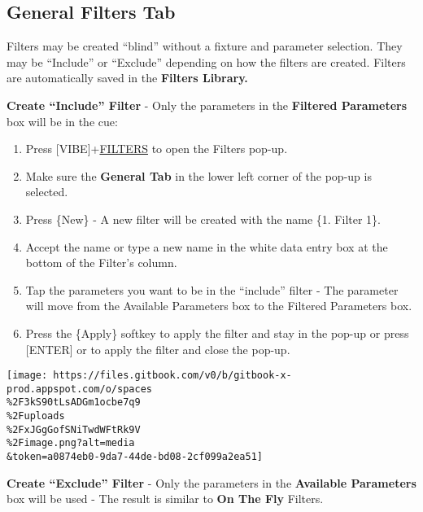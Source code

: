 \documentclass[
]{article}
\begin{document}
\hypertarget{general-filters-tab}{%
\subsection{General Filters Tab}\label{general-filters-tab}}

Filters may be created ``blind'' without a fixture and parameter selection. They may be ``Include'' or ``Exclude'' depending on how the filters are created. Filters are automatically saved in the \textbf{Filters Library.}

\textbf{Create ``Include'' Filter} - Only the parameters in the \textbf{Filtered Parameters} box will be in the cue:

\begin{enumerate}
\def\labelenumi{\arabic{enumi}.}
\item
  Press {[}VIBE{]}+\protect\hyperlink{filters}{FILTERS} to open the Filters pop-up.
\item
  Make sure the \textbf{General Tab} in the lower left corner of the pop-up is selected.
\item
  Press \{New\} - A new filter will be created with the name \{1. Filter 1\}.
\item
  Accept the name or type a new name in the white data entry box at the bottom of the Filter's column.
\item
  Tap the parameters you want to be in the ``include'' filter - The parameter will move from the Available Parameters box to the Filtered Parameters box.
\item
  Press the \{Apply\} softkey to apply the filter and stay in the pop-up or press {[}ENTER{]} or \href{image.png}{} to apply the filter and close the pop-up.
\end{enumerate}

\texttt{[image: https://files.gitbook.com/v0/b/gitbook-x-prod.appspot.com/o/spaces\\\%2F3kS90tLsADGm1ocbe7q9\\\%2Fuploads\\\%2FxJGgGofSNiTwdWFtRk9V\\\%2Fimage.png?alt=media\\\&token=a0874eb0-9da7-44de-bd08-2cf099a2ea51]}

\textbf{Create ``Exclude'' Filter} - Only the parameters in the \textbf{Available Parameters} box will be used - The result is similar to \textbf{On The Fly} Filters.
\end{document}
